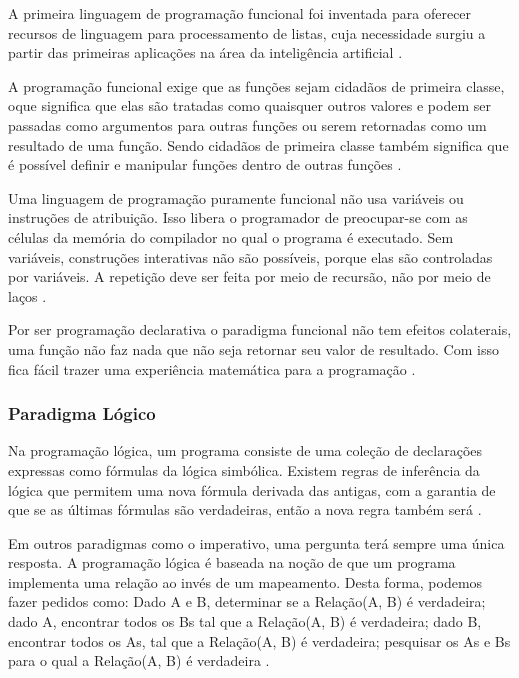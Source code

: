 A primeira linguagem de programação funcional foi inventada para oferecer recursos de linguagem para processamento de listas, cuja necessidade surgiu a partir das primeiras aplicações na área da inteligência artificial \cite[pág.~361]{tucker2009}.

A programação funcional exige que as funções sejam cidadãos de primeira classe, oque significa que elas são tratadas como quaisquer outros valores e podem ser passadas como argumentos para outras funções ou serem retornadas como um resultado de uma função. Sendo cidadãos de primeira classe também significa que é possível definir e manipular funções dentro de outras funções \cite{hoogle2013}.
	
Uma linguagem de programação puramente funcional não usa variáveis ou instruções de atribuição. Isso libera o programador de preocupar-se com as células da memória do compilador no qual o programa é executado. Sem variáveis, construções interativas não são possíveis, porque elas são controladas por variáveis. A repetição deve ser feita por meio de recursão, não por meio de laços \cite[pág.~555]{sebesta2012}.

Por ser programação declarativa o paradigma funcional não tem efeitos colaterais, uma função não faz nada que não seja retornar seu valor de resultado. Com isso fica fácil trazer uma experiência matemática para a programação \cite{piponi2006}.

\subsubsection{Paradigma Lógico}

Na programação lógica, um programa consiste de uma coleção de declarações expressas como fórmulas da lógica simbólica. Existem regras de inferência da lógica que permitem uma nova fórmula derivada das antigas, com a garantia de que se as últimas fórmulas são verdadeiras, então a nova regra também será \cite[pág.~2]{spivey1996}. 

Em outros paradigmas como o imperativo, uma pergunta terá sempre uma única resposta. A programação lógica é baseada na noção de que um programa implementa uma relação ao invés de um mapeamento. Desta forma, podemos fazer pedidos como: Dado A e B, determinar se a Relação(A, B) é verdadeira; dado A, encontrar todos os Bs tal que a Relação(A, B) é verdadeira; dado B, encontrar todos os As, tal que a Relação(A, B) é verdadeira; pesquisar os As e Bs para o qual a Relação(A, B) é verdadeira \cite[pág.~33]{paquet2010}.

